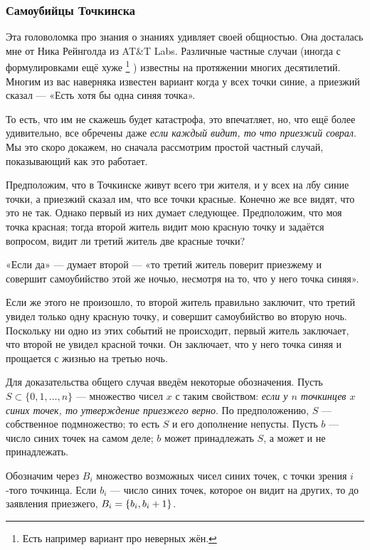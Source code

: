 \subsubsection*{Самоубийцы Точкинска}

Эта головоломка про знания о знаниях удивляет своей общностью.
Она досталась мне от Ника Рейнголда из AT\&T Labs.
Различные частные случаи (иногда с формулировками ещё хуже%
\footnote{Есть например вариант про неверных жён.}%
) известны на протяжении многих десятилетий.
Многим из вас наверняка известен вариант когда у всех точки синие, а приезжий сказал --- «Есть хотя бы одна синяя точка».

То есть, что им не скажешь будет катастрофа, 
это впечатляет,
но, что ещё более удивительно, все обречены даже \emph{если каждый видит, то что приезжий соврал}. 
Мы это скоро докажем, но сначала рассмотрим простой частный случай, показывающий как это работает.

Предположим, что в Точкинске живут всего три жителя, и у всех на лбу синие точки,
а приезжий сказал им, что все точки красные.
Конечно же все видят, что это не так.
Однако первый из них думает следующее.
Предположим, что моя точка красная; тогда второй житель видит мою красную точку и задаётся вопросом, видит ли третий житель две красные точки?

«Если да» --- думает второй --- «то третий житель поверит приезжему и совершит самоубийство этой же ночью, несмотря на то, что у него точка синяя».

Если же этого не произошло, то второй житель правильно заключит, что третий увидел только одну красную точку, и совершит самоубийство во вторую ночь.
Поскольку ни одно из этих событий не происходит, первый житель заключает, что второй не увидел красной точки.
Он заключает, что у него точка синяя и прощается с жизнью на третью ночь.

Для доказательства общего случая введём некоторые обозначения.
Пусть $S\subset\{0,1,\dots,n\}$ --- множество чисел $x$ с таким свойством: \emph{если у $n$ точкинцев $x$ синих точек, то утверждение приезжего верно}.
По предположению, $S$ --- собственное подмножество; то есть $S$ и его дополнение непусты.
Пусть $b$ --- число синих точек на самом деле;
$b$ может принадлежать $S$, а может и не принадлежать.

Обозначим через $B_i$ множество возможных чисел синих точек, с точки зрения $i$-того точкинца.
Если $b_i$ --- число синих точек, которое он видит на других, то до заявления приезжего, $B_i=\{b_i,b_i\z+1\}$.

